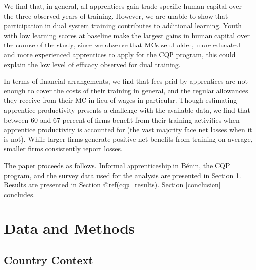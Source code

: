 \documentclass[
  a4paper, twoside, 12pt]{book}
\begin{document}
We find that, in general, all apprentices gain trade-specific human capital over the three observed years of training. However, we are unable to show that participation in dual system training contributes to additional learning. Youth with low learning scores at baseline make the largest gains in human capital over the course of the study; since we observe that MCs send older, more educated and more experienced apprentices to apply for the CQP program, this could explain the low level of efficacy observed for dual training.

In terms of financial arrangements, we find that fees paid by apprentices are not enough to cover the costs of their training in general, and the regular allowances they receive from their MC in lieu of wages in particular. Though estimating apprentice productivity presents a challenge with the available data, we find that between 60 and 67 percent of firms benefit from their training activities when apprentice productivity is accounted for (the vast majority face net losses when it is not). While larger firms generate positive net benefits from training on average, smaller firms consistently report losses.

The paper proceeds as follows. Informal apprenticeship in Bénin, the CQP program, and the survey data used for the analysis are presented in Section \ref{data}. Results are presented in Section @ref(cqp\_results). Section \ref{conclusion} concludes.

\hypertarget{data}{%
\section{Data and Methods}\label{data}}

\hypertarget{country-context}{%
\subsection{Country Context}\label{country-context}}
\end{document}
